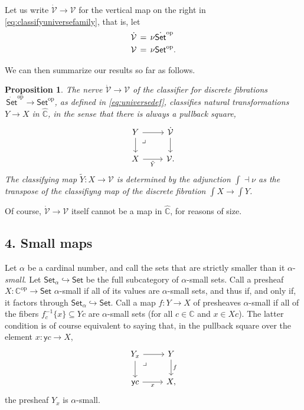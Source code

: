 \documentclass[11pt]{article}
\newcommand{\C}{\ensuremath{\mathbb{C}}}
\newcommand{\op}[1]{\ensuremath{{#1}^{\mathrm{op}}}}
\newcommand{\Set}{\ensuremath{\mathsf{Set}}}
\newcommand{\y}{\ensuremath{\mathsf{y}}} %
\newcommand{\hook}{\ensuremath{\hookrightarrow}}
\renewcommand{\to}{\ensuremath{\rightarrow}}
\newcommand{\SSet}{\ensuremath{\,\dot{\Set}}}
\newcommand{\V}{\ensuremath{\mathcal{V}}}
\newcommand{\VV}{\ensuremath{\dot{\mathcal{V}}}}
\newcommand{\elem}[1]{\textstyle\int\!{#1}}
\newcommand{\pbmark}{\ar[dr, phantom, "\lrcorner" very near start, shift right=.5ex]}	%
\newtheorem{proposition}[theorem]{Proposition}
\theoremstyle{remark}
\theoremstyle{definition}
\begin{document}
Let us write $\VV \to \V$ for the vertical map on the right in \eqref{eq:classifyuniversefamily},  that is, let
\begin{align}\label{eq:universedef}\textstyle
\VV\, &=\, \nu\op{\dot{\Set}}\\  
\V\, &=\, \nu\op{\Set}.\notag
 \end{align}
 
 We can then summarize our results so far as follows.

 \begin{proposition}\label{prop:Vclassifies}
The nerve $\VV\to\V$  of the classifier for discrete fibrations $\op\SSet\to\op\Set$, as defined in \eqref{eq:universedef}, classifies natural transformations $Y\to X$ in $\widehat{\C}$, in the sense that there is always a pullback square,
\begin{equation}\label{eq:classifyuniversefamily2}\textstyle
\begin{tikzcd}
	 Y \ar[d] \pbmark \ar[r] & \VV \ar[d] \\  
	X \ar[r,swap, "\tilde{Y} "] &  \V.
 \end{tikzcd}
 \end{equation}
The classifying map $\tilde{Y} : X\to \V$ is determined by the adjunction $\int \dashv \nu$ as the transpose of the classifiyng map of the discrete fibration $\elem X\to\elem Y$.
\end{proposition}
 
 Of course, $\VV\to\V$ itself cannot be a map in $\widehat{\C}$, for reasons of size.

\subsection*{4. Small maps}

Let $\alpha$ be a cardinal number, and call the sets that are strictly smaller than it $\alpha$-\emph{small}.  Let $\Set_\alpha\hook\Set$ be the full subcategory of $\alpha$-small sets.  
Call a presheaf $X : \op{\C} \to \Set$ $\alpha$-small if all of its values are $\alpha$-small sets, and thus if, and only if, it factors through $\Set_\alpha\hook\Set$. Call a map $f:Y\to X$ of presheaves $\alpha$-small if all of the fibers $f_c^{-1}\{ x\} \subseteq Yc$ are $\alpha$-small sets (for all $c\in\C$ and $x\in Xc$). The latter condition is of course equivalent to saying that, in the pullback square over the element $x:\y{c} \to X$, 
\begin{equation}\label{eq:smallmap}\textstyle
\begin{tikzcd}
	 Y_x \ar[d] \pbmark \ar[r] & Y \ar[d, "f"] \\  
	\y{c} \ar[r,swap,"x"] &  X,
 \end{tikzcd}
 \end{equation}
the presheaf $Y_x$ is $\alpha$-small.
\end{document}
